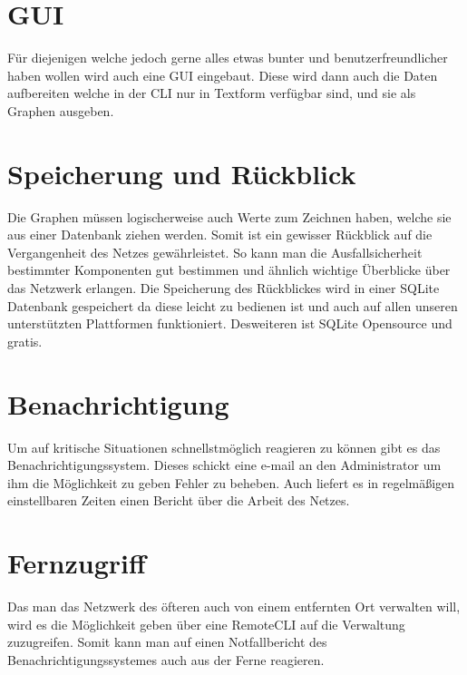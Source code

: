 \documentclass[10pt,a4paper]{report}
\begin{document}
\section{GUI}
Für diejenigen welche jedoch gerne alles etwas bunter und benutzerfreundlicher haben wollen wird auch eine GUI eingebaut. Diese wird dann auch die Daten aufbereiten welche in der CLI nur in Textform verfügbar sind, und sie als Graphen ausgeben. 
\section{Speicherung und Rückblick}
Die Graphen müssen logischerweise auch Werte zum Zeichnen haben, welche sie aus einer Datenbank ziehen werden. Somit ist ein gewisser Rückblick auf die Vergangenheit des Netzes gewährleistet. So kann man die Ausfallsicherheit bestimmter Komponenten gut bestimmen und ähnlich wichtige Überblicke über das Netzwerk erlangen. Die Speicherung des Rückblickes wird in einer SQLite Datenbank gespeichert da diese leicht zu bedienen ist und auch auf allen unseren unterstützten Plattformen funktioniert. Desweiteren ist SQLite Opensource und gratis. 
\section{Benachrichtigung}
Um auf kritische Situationen schnellstmöglich reagieren zu können gibt es das Benachrichtigungssystem. Dieses schickt eine e-mail an den Administrator um ihm die Möglichkeit zu geben Fehler zu beheben. Auch liefert es in regelmäßigen einstellbaren Zeiten einen Bericht über die Arbeit des Netzes. 
\section{Fernzugriff}
Das man das Netzwerk des öfteren auch von einem entfernten Ort verwalten will, wird es die Möglichkeit geben über eine RemoteCLI auf die Verwaltung zuzugreifen. Somit kann man auf einen Notfallbericht des Benachrichtigungssystemes auch aus der Ferne reagieren. 
\end{document}
